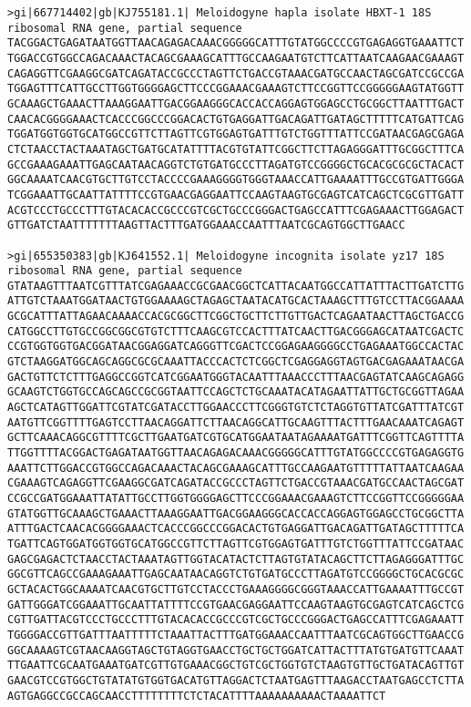 \documentclass[11pt]{article}
\begin{document}
\begin{Verbatim}[commandchars=\\\{\}]
>gi|667714402|gb|KJ755181.1| Meloidogyne hapla isolate HBXT-1 18S ribosomal RNA gene, partial sequence
TACGGACTGAGATAATGGTTAACAGAGACAAACGGGGGCATTTGTATGGCCCCGTGAGAGGTGAAATTCT
TGGACCGTGGCCAGACAAACTACAGCGAAAGCATTTGCCAAGAATGTCTTCATTAATCAAGAACGAAAGT
CAGAGGTTCGAAGGCGATCAGATACCGCCCTAGTTCTGACCGTAAACGATGCCAACTAGCGATCCGCCGA
TGGAGTTTCATTGCCTTGGTGGGGAGCTTCCCGGAAACGAAAGTCTTCCGGTTCCGGGGGAAGTATGGTT
GCAAAGCTGAAACTTAAAGGAATTGACGGAAGGGCACCACCAGGAGTGGAGCCTGCGGCTTAATTTGACT
CAACACGGGGAAACTCACCCGGCCCGGACACTGTGAGGATTGACAGATTGATAGCTTTTTCATGATTCAG
TGGATGGTGGTGCATGGCCGTTCTTAGTTCGTGGAGTGATTTGTCTGGTTTATTCCGATAACGAGCGAGA
CTCTAACCTACTAAATAGCTGATGCATATTTTACGTGTATTCGGCTTCTTAGAGGGATTTGCGGCTTTCA
GCCGAAAGAAATTGAGCAATAACAGGTCTGTGATGCCCTTAGATGTCCGGGGCTGCACGCGCGCTACACT
GGCAAAATCAACGTGCTTGTCCTACCCCGAAAGGGGTGGGTAAACCATTGAAAATTTGCCGTGATTGGGA
TCGGAAATTGCAATTATTTTCCGTGAACGAGGAATTCCAAGTAAGTGCGAGTCATCAGCTCGCGTTGATT
ACGTCCCTGCCCTTTGTACACACCGCCCGTCGCTGCCCGGGACTGAGCCATTTCGAGAAACTTGGAGACT
GTTGATCTAATTTTTTTAAGTTACTTTGATGGAAACCAATTTAATCGCAGTGGCTTGAACC

>gi|655350383|gb|KJ641552.1| Meloidogyne incognita isolate yz17 18S ribosomal RNA gene, partial sequence
GTATAAGTTTAATCGTTTATCGAGAAACCGCGAACGGCTCATTACAATGGCCATTATTTACTTGATCTTG
ATTGTCTAAATGGATAACTGTGGAAAAGCTAGAGCTAATACATGCACTAAAGCTTTGTCCTTACGGAAAA
GCGCATTTATTAGAACAAAACCACGCGGCTTCGGCTGCTTCTTGTTGACTCAGAATAACTTAGCTGACCG
CATGGCCTTGTGCCGGCGGCGTGTCTTTCAAGCGTCCACTTTATCAACTTGACGGGAGCATAATCGACTC
CCGTGGTGGTGACGGATAACGGAGGATCAGGGTTCGACTCCGGAGAAGGGGCCTGAGAAATGGCCACTAC
GTCTAAGGATGGCAGCAGGCGCGCAAATTACCCACTCTCGGCTCGAGGAGGTAGTGACGAGAAATAACGA
GACTGTTCTCTTTGAGGCCGGTCATCGGAATGGGTACAATTTAAACCCTTTAACGAGTATCAAGCAGAGG
GCAAGTCTGGTGCCAGCAGCCGCGGTAATTCCAGCTCTGCAAATACATAGAATTATTGCTGCGGTTAGAA
AGCTCATAGTTGGATTCGTATCGATACCTTGGAACCCTTCGGGTGTCTCTAGGTGTTATCGATTTATCGT
AATGTTCGGTTTTGAGTCCTTAACAGGATTCTTAACAGGCATTGCAAGTTTACTTTGAACAAATCAGAGT
GCTTCAAACAGGCGTTTTCGCTTGAATGATCGTGCATGGAATAATAGAAAATGATTTCGGTTCAGTTTTA
TTGGTTTTACGGACTGAGATAATGGTTAACAGAGACAAACGGGGGCATTTGTATGGCCCCGTGAGAGGTG
AAATTCTTGGACCGTGGCCAGACAAACTACAGCGAAAGCATTTGCCAAGAATGTTTTTATTAATCAAGAA
CGAAAGTCAGAGGTTCGAAGGCGATCAGATACCGCCCTAGTTCTGACCGTAAACGATGCCAACTAGCGAT
CCGCCGATGGAAATTATATTGCCTTGGTGGGGAGCTTCCCGGAAACGAAAGTCTTCCGGTTCCGGGGGAA
GTATGGTTGCAAAGCTGAAACTTAAAGGAATTGACGGAAGGGCACCACCAGGAGTGGAGCCTGCGGCTTA
ATTTGACTCAACACGGGGAAACTCACCCGGCCCGGACACTGTGAGGATTGACAGATTGATAGCTTTTTCA
TGATTCAGTGGATGGTGGTGCATGGCCGTTCTTAGTTCGTGGAGTGATTTGTCTGGTTTATTCCGATAAC
GAGCGAGACTCTAACCTACTAAATAGTTGGTACATACTCTTAGTGTATACAGCTTCTTAGAGGGATTTGC
GGCGTTCAGCCGAAAGAAATTGAGCAATAACAGGTCTGTGATGCCCTTAGATGTCCGGGGCTGCACGCGC
GCTACACTGGCAAAATCAACGTGCTTGTCCTACCCTGAAAGGGGCGGGTAAACCATTGAAAATTTGCCGT
GATTGGGATCGGAAATTGCAATTATTTTCCGTGAACGAGGAATTCCAAGTAAGTGCGAGTCATCAGCTCG
CGTTGATTACGTCCCTGCCCTTTGTACACACCGCCCGTCGCTGCCCGGGACTGAGCCATTTCGAGAAATT
TGGGGACCGTTGATTTAATTTTTCTAAATTACTTTGATGGAAACCAATTTAATCGCAGTGGCTTGAACCG
GGCAAAAGTCGTAACAAGGTAGCTGTAGGTGAACCTGCTGCTGGATCATTACTTTATGTGATGTTCAAAT
TTGAATTCGCAATGAAATGATCGTTGTGAAACGGCTGTCGCTGGTGTCTAAGTGTTGCTGATACAGTTGT
GAACGTCCGTGGCTGTATATGTGGTGACATGTTAGGACTCTAATGAGTTTAAGACCTAATGAGCCTCTTA
AGTGAGGCCGCCAGCAACCTTTTTTTTCTCTACATTTTAAAAAAAAAACTAAAATTCT


\end{Verbatim}
\end{document}
